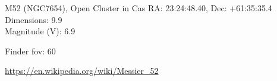 \begin{block}{M52 (NGC7654), Open Cluster in Cas}
    RA: 23:24:48.40, Dec: +61:35:35.4 \\ 
    Dimensions: 9.9 \\ 
    Magnitude (V): 6.9



    Finder fov: 60 

    \url{https://en.wikipedia.org/wiki/Messier_52} 
\end{block}